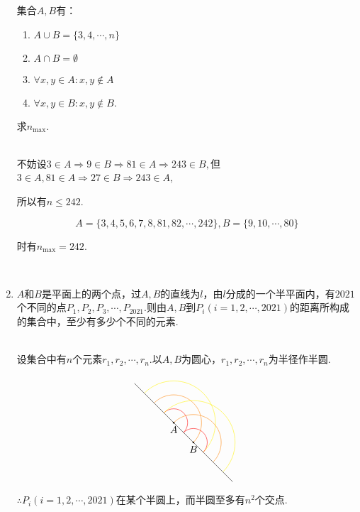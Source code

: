 \documentclass[8pt]{article}
\begin{document}
\begin{enumerate}
			集合$A,B$有：

			\begin{enumerate}[ (1) ]
				\item $A\cup B=\{3,4,\cdots,n\}$

				\item $A\cap B=\emptyset$

				\item $\forall x,y \in A: x,y \notin A$

				\item $\forall x,y \in B: x,y \notin B.$

			\end{enumerate}

			求$n_{\max}$.

			~\\
			不妨设$3\in A \Rightarrow 9 \in B \Rightarrow 81 \in A \Rightarrow 243 \in B,$但$3\in A, 81\in A \Rightarrow 27\in B \Rightarrow 243\in A$,

			所以有$n\leq242$.

			$$
			A=\{3,4,5,6,7,8,81,82,\cdots,242\}, B=\{9,10,\cdots,80\}
			$$

			时有$n_{\max}=242.$

		~\\

		\item

			$A$和$B$是平面上的两个点，过$A,B$的直线为$l$，由$l$分成的一个半平面内，有$2021$个不同的点$P_1,P_2,P_3,\cdots,P_{2021}$.则由$A,B$到$P_i(i=1,2,\cdots,2021)$的距离所构成的集合中，至少有多少个不同的元素.

			~\\
			设集合中有$n$个元素$r_1,r_2,\cdots,r_n$.以$A,B$为圆心，$r_1,r_2,\cdots,r_n$为半径作半圆.

			$$
			\begin{tikzpicture} [scale=0.35]
				\draw  [black](-5,5)--(5,-5);
				\filldraw [black] (-1,  1) circle (2pt) node[anchor=north] {$A$};
				\filldraw [black] (1 , -1) circle (2pt) node[anchor=north] {$B$};
				\draw [red] (0, 0) arc (-45:135:{sqrt(2)});
				\draw [orange] (1, -1) arc (-45:135:{2*sqrt(2)});
				\draw [yellow] (2, -2) arc (-45:135:{3*sqrt(2)});
				\draw [red] (2, -2) arc (-45:135:{sqrt(2)});
				\draw [orange] (3, -3) arc (-45:135:{2*sqrt(2)});
				\draw [yellow] (4, -4) arc (-45:135:{3*sqrt(2)});
			\end{tikzpicture}
			$$

			$\therefore P_i(i=1,2,\cdots,2021)$在某个半圆上，而半圆至多有$n^2$个交点.


\end{enumerate}
\end{document}
